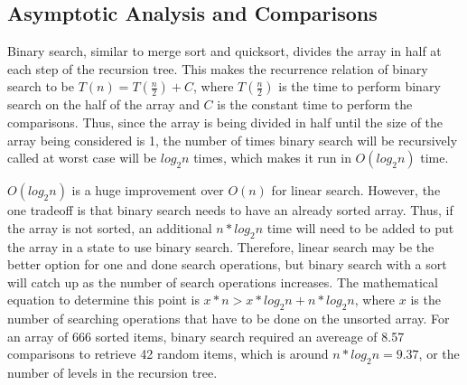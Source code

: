 \documentclass[letterpaper, 10pt,DIV=13]{scrartcl}
\numberwithin{equation}{section} %
\numberwithin{figure}{section} %
\numberwithin{table}{section} %
\begin{document}
\subsection{Asymptotic Analysis and Comparisons}
Binary search, similar to merge sort and quicksort, divides the array in half at each step of the recursion tree. This makes the recurrence relation of binary search to be $T(n) = T(\frac{n}{2}) + C$, where $T(\frac{n}{2})$ is the time to perform binary search on the half of the array and $C$ is the constant time to perform the comparisons. Thus, since the array is being divided in half until the size of the array being considered is 1, the number of times binary search will be recursively called at worst case will be $log_2n$ times, which makes it run in $O(log_2n)$ time.

$O(log_2n)$ is a huge improvement over $O(n)$ for linear search. However, the one tradeoff is that binary search needs to have an already sorted array. Thus, if the array is not sorted, an additional $n * log_2n$ time will need to be added to put the array in a state to use binary search. Therefore, linear search may be the better option for one and done search operations, but binary search with a sort will catch up as the number of search operations increases. The mathematical equation to determine this point is $x * n > x * log_2n + n * log_2n$, where $x$ is the number of searching operations that have to be done on the unsorted array. For an array of 666 sorted items, binary search required an avereage of 8.57 comparisons to retrieve 42 random items, which is around $n * log_2n = 9.37$, or the number of levels in the recursion tree.
\end{document}
